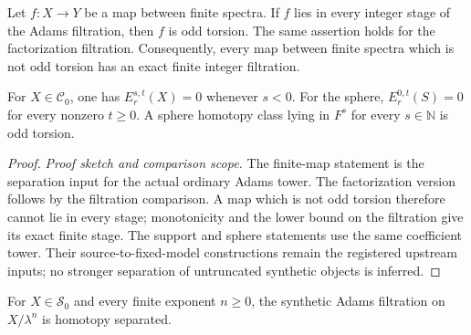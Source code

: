 \begin{theorem}
\label{sem:AdamsSynthetic:finite-separation}
Let $f\colon X\to Y$ be a map between finite spectra. If $f$ lies in every integer stage of the Adams filtration, then $f$ is odd torsion. The same assertion holds for the factorization filtration. Consequently, every map between finite spectra which is not odd torsion has an exact finite integer filtration.

For $X\in\mathcal C_0$, one has $E_r^{s,t}(X)=0$ whenever $s<0$. For the sphere, $E_r^{0,t}(S)=0$ for every nonzero $t\geq0$. A sphere homotopy class lying in $F^s$ for every $s\in\mathbb N$ is odd torsion.
\end{theorem}
\begin{proof}
\textit{Proof sketch and comparison scope.}
The finite-map statement is the separation input for the actual ordinary
Adams tower. The factorization version follows by the filtration comparison.
A map which is not odd torsion therefore cannot lie in every stage;
monotonicity and the lower bound on the filtration give its exact finite
stage. The support and sphere statements use the same coefficient tower.
Their source-to-fixed-model constructions remain the registered upstream
inputs; no stronger separation of untruncated synthetic objects is inferred.
\end{proof}


\begin{theorem}[Separation on finite lambda quotients]
\label{sem:AdamsSynthetic:finite-quotient-separation}
For $X\in\mathcal S_0$ and every finite exponent $n\geq0$, the synthetic Adams filtration on $X/\lambda^n$ is homotopy separated.
\end{theorem}

